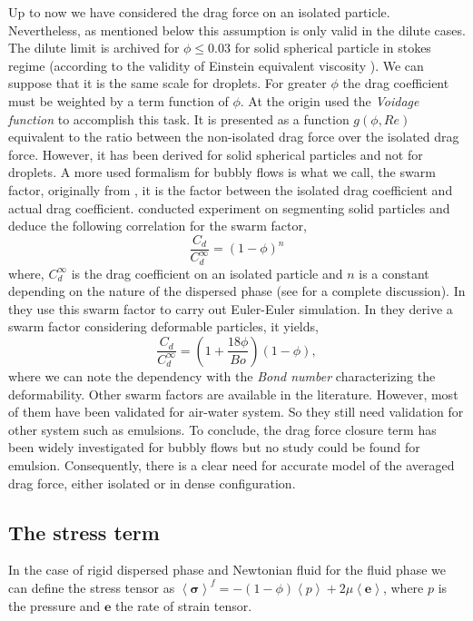 Up to now we have considered the drag force on an isolated particle.
Nevertheless, as mentioned below this assumption is only valid in the dilute cases.
The dilute limit is archived for $\phi \le 0.03$ for solid spherical particle in stokes regime (according to the validity of Einstein equivalent viscosity \citet{einstein1905neue}). 
We can suppose that it is the same scale for droplets. 
For greater $\phi$ the drag coefficient must be weighted by a term function of $\phi$.
At the origin \citet{di1994voidage} used the \textit{Voidage function} to accomplish this task.
It is presented as a function $g(\phi,Re)$ equivalent to the ratio between the non-isolated drag force over the isolated drag force.
However, it has been derived for solid spherical particles and not for droplets. 
A more used formalism for bubbly flows is what we call, the swarm factor, originally from \citet{richardson1997sedimentation}, it is the factor between the isolated drag coefficient and actual drag coefficient.
\citet{richardson1997sedimentation} conducted experiment on segmenting solid particles and deduce the following correlation for the swarm factor,
\begin{equation}
    \frac{C_d}{C_d^{\infty}} = (1-\phi)^n
\end{equation}
where, $C_d^{\infty}$ is the drag coefficient on an isolated particle and $n$ is a constant depending on the nature of the dispersed phase (see \citet[Appendix B]{gemello2018modelling} for a complete discussion).
In \citet{sporleder2012population} they use this swarm factor to carry out Euler-Euler simulation.
In \citet{roghair2011drag} they derive a swarm factor considering deformable particles, it yields,
\begin{equation}
    \frac{C_d}{C_d^{\infty}} = \left(1+\frac{18\phi}{Bo}\right)(1-\phi),
\end{equation}
where we can note the dependency with the \textit{Bond number} characterizing the deformability. 
Other swarm factors are available in the literature.
However, most of them have been validated for air-water system. 
So they still need validation for other system such as emulsions.
To conclude, the drag force closure term has been widely investigated for bubbly flows but no study could be found for emulsion. 
Consequently, there is a clear need for accurate model of the averaged drag force, either isolated or in dense configuration. 
\cite{fox2012large}

\subsection{The stress term}
In the case of rigid dispersed phase and Newtonian fluid for the fluid phase we can define the stress tensor as $\left<\bm{\sigma}\right>^f = -(1-\phi)\left<p\right> + 2\mu\left<\bm{e}\right>$, where $p$ is the pressure and $\bm{e}$ the rate of strain tensor. 

